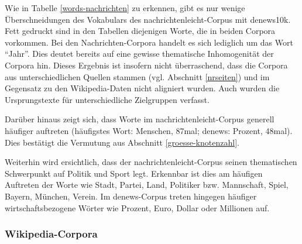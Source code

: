 \documentclass[11pt, a4paper]{article}
\begin{document}
Wie in Tabelle \ref{words-nachrichten} zu erkennen, gibt es nur wenige
Überschneidungen des Vokabulars des nachrichtenleicht-Corpus mit denews10k.
Fett gedruckt sind in den Tabellen diejenigen Worte, die in beiden Corpora
vorkommen.
Bei den Nachrichten-Corpora handelt es sich lediglich um das Wort "`Jahr"'.
Dies deutet bereits auf eine gewisse thematische Inhomogenität der Corpora hin.
Dieses Ergebnis ist insofern nicht überraschend, dass die Corpora aus
unterschiedlichen Quellen stammen (vgl. Abschnitt \ref{nrseiten}) und
im Gegensatz zu den Wikipedia-Daten nicht aligniert wurden.
Auch wurden die Ursprungstexte für unterschiedliche Zielgruppen verfasst.

Darüber hinaus zeigt sich, dass Worte im nachrichtenleicht-Corpus generell
häufiger auftreten (häufigstes Wort: Menschen, 87mal; denews: Prozent, 48mal).
Dies bestätigt die Vermutung aus Abschnitt \ref{groesse-knotenzahl}.

Weiterhin wird ersichtlich, dass der nachrichtenleicht-Corpus seinen
thematischen Schwerpunkt auf Politik und Sport legt.
Erkennbar ist dies am häufigen Auftreten der Worte wie Stadt, Partei, Land,
Politiker bzw. Mannschaft, Spiel, Bayern, München, Verein.
Im denews-Corpus treten hingegen häufiger wirtschaftsbezogene Wörter wie Prozent,
Euro, Dollar oder Millionen auf.


\subsubsection{Wikipedia-Corpora}
\end{document}
